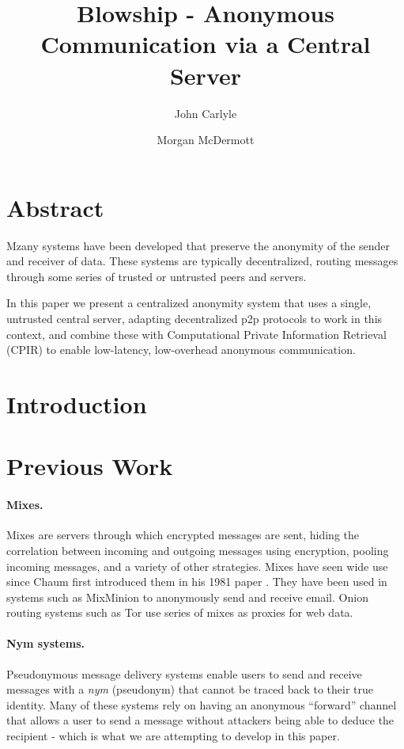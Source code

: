 \documentclass{paper}
\title{Blowship - Anonymous Communication via a Central Server}
\author[*]{John Carlyle}
\author[**]{Morgan McDermott}
\affil[*]{University of fighitng bears}
\affil[**]{University of sillypants}
\begin{document}
\maketitle
\twocolumn

\section*{Abstract} 
  Mzany systems have been developed that preserve the anonymity of the sender and receiver of data. These systems are typically decentralized, routing messages through some series of trusted or untrusted peers and servers. 

In this paper we present a centralized anonymity system that uses a single, untrusted central server, adapting decentralized p2p protocols to work in this context, and combine these with Computational Private Information Retrieval (CPIR) to enable low-latency, low-overhead anonymous communication.
\section{Introduction}
 
\section{Previous Work}
\paragraph{Mixes.} Mixes are servers through which encrypted messages are sent, hiding the correlation between incoming and outgoing messages using encryption, pooling incoming messages, and a variety of other strategies. Mixes have seen wide use since Chaum first introduced them in his 1981 paper \cite{chaum-mix}. They have been used in systems such as MixMinion\cite{minion-design} to anonymously send and receive email. Onion routing systems such as Tor \cite{tor-design} use series of mixes as proxies for web data. 

\paragraph{Nym systems.} Pseudonymous message delivery systems enable users to send and receive messages with a \textit{nym} (pseudonym) that cannot be traced back to their true identity. Many of these systems rely on having an anonymous ``forward'' channel that allows a user to send a message without attackers being able to deduce the recipient - which is what we are attempting to develop in this paper. 
\end{document}
